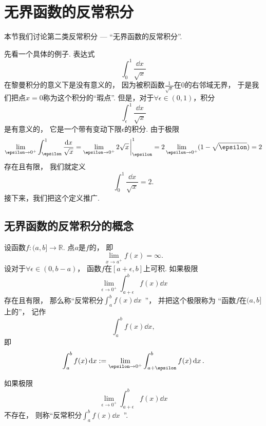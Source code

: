 \section{无界函数的反常积分}
本节我们讨论第二类反常积分 --- “无界函数的反常积分”.

先看一个具体的例子.
表达式\begin{equation*}
	\int_0^1 \frac{\dd{x}}{\sqrt{x}}
\end{equation*}在黎曼积分的意义下是没有意义的，
因为被积函数\(\frac{1}{\sqrt{x}}\)在\(0\)的右邻域无界，
于是我们把点\(x=0\)称为这个积分的“瑕点”.
但是，对于\(\forall\epsilon\in(0,1)\)，积分\begin{equation*}
	\int_\epsilon^1 \frac{\dd{x}}{\sqrt{x}}
\end{equation*}是有意义的，
它是一个带有变动下限\(\epsilon\)的积分.
由于极限\begin{equation*}
	\lim_{\epsilon\to0^+} \int_\epsilon^1 \frac{\dd{x}}{\sqrt{x}}
	= \lim_{\epsilon\to0^+} 2\sqrt{x}\eval_\epsilon^1
	= 2 \lim_{\epsilon\to0^+} (1-\sqrt\epsilon)
	= 2
\end{equation*}存在且有限，
我们就定义\begin{equation*}
	\int_0^1 \frac{\dd{x}}{\sqrt{x}}=2.
\end{equation*}
接下来，我们把这个定义推广.

\subsection{无界函数的反常积分的概念}
\begin{definition}\label{definition:定积分.无界函数的反常积分的定义1}
设函数\(f\colon(a,b]\to\mathbb{R}\).
点\(a\)是\(f\)的，
即\begin{equation*}
	\lim_{x \to a^+} f(x) = \infty.
\end{equation*}
设对于\(\forall\epsilon\in(0,b-a)\)，
函数\(f\)在\([a+\epsilon,b]\)上可积.
如果极限\begin{equation*}
	\lim_{\epsilon\to0^+} \int_{a+\epsilon}^b f(x) \dd{x}
\end{equation*}存在且有限，
那么称“反常积分\(\int_a^b f(x) \dd{x}\)~”，
并把这个极限称为
“函数\(f\)在\((a,b]\)上的”，
记作\begin{equation*}
	\int_a^b f(x) \dd{x},
\end{equation*}
即\begin{equation*}
	\int_a^b f(x) \dd{x}
	\defeq
	\lim_{\epsilon\to0^+} \int_{a+\epsilon}^b f(x) \dd{x}.
\end{equation*}

如果极限\begin{equation*}
	\lim_{\epsilon\to0^+} \int_{a+\epsilon}^b f(x) \dd{x}
\end{equation*}不存在，
则称“反常积分\(\int_a^b f(x) \dd{x}\)~”.
\end{definition}

